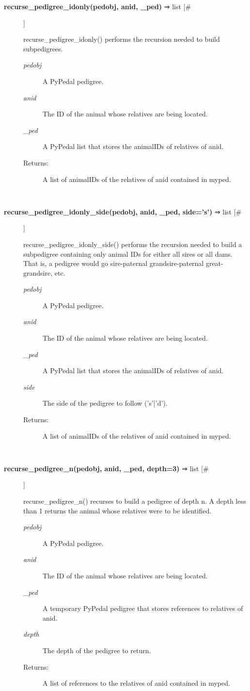 \documentclass[10pt]{article}
\begin{document}
\begin{description}
\item[\textbf{recurse\_pedigree\_idonly(pedobj, anid, \_ped)}
 ⇒ list [\#]]

 recurse\_pedigree\_idonly() performs the recursion needed to build subpedigrees.
\begin{description}
\item[\emph{pedobj}
] A PyPedal pedigree.
\item[\emph{anid}
] The ID of the animal whose relatives are being located.
\item[\emph{\_ped}
] A PyPedal list that stores the animalIDs of relatives of anid.
\item[Returns:] A list of animalIDs of the relatives of anid contained in myped.

\end{description}
\\ 

\item[\textbf{recurse\_pedigree\_idonly\_side(pedobj, anid, \_ped, side='s')}
 ⇒ list [\#]]

 recurse\_pedigree\_idonly\_side() performs the recursion needed to build a subpedigree containing only animal IDs for either all sires or all dams. That is, a pedigree would go sire-paternal grandsire-paternal great-grandsire, etc.
\begin{description}
\item[\emph{pedobj}
] A PyPedal pedigree.
\item[\emph{anid}
] The ID of the animal whose relatives are being located.
\item[\emph{\_ped}
] A PyPedal list that stores the animalIDs of relatives of anid.
\item[\emph{side}
] The side of the pedigree to follow ('s'|'d').
\item[Returns:] A list of animalIDs of the relatives of anid contained in myped.

\end{description}
\\ 

\item[\textbf{recurse\_pedigree\_n(pedobj, anid, \_ped, depth=3)}
 ⇒ list [\#]]

 recurse\_pedigree\_n() recurses to build a pedigree of depth n. A depth less than 1 returns the animal whose relatives were to be identified.
\begin{description}
\item[\emph{pedobj}
] A PyPedal pedigree.
\item[\emph{anid}
] The ID of the animal whose relatives are being located.
\item[\emph{\_ped}
] A temporary PyPedal pedigree that stores references to relatives of anid.
\item[\emph{depth}
] The depth of the pedigree to return.
\item[Returns:] A list of references to the relatives of anid contained in myped.


\end{description}
\end{description}
\end{document}
